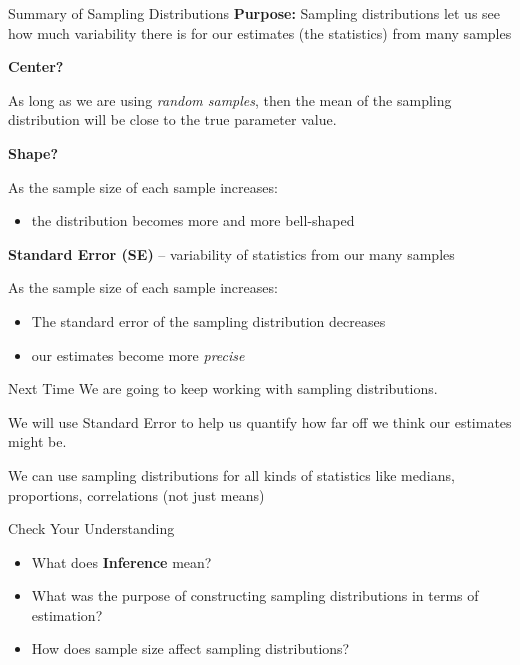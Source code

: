 \documentclass{beamer}
\begin{document}
\begin{frame}{Summary of Sampling Distributions}
\textbf{Purpose:} Sampling distributions let us see how much variability there is for our estimates (the statistics) from many samples \vspace{4mm}

\textbf{Center?}

As long as we are using \textit{random samples}, then the mean of the sampling distribution will be close to the true parameter value. \vspace{4mm}

\textbf{Shape?}

As the sample size of each sample increases:
\begin{itemize}
    \item the distribution becomes more and more bell-shaped
\end{itemize} \vspace{4mm}

\textbf{Standard Error (SE)} -- variability of statistics from our many samples

As the sample size of each sample increases:
\begin{itemize}
    \item The standard error of the sampling distribution decreases
    \item our estimates become more \textit{precise}
\end{itemize}
\end{frame}

\begin{frame}{Next Time}
We are going to keep working with sampling distributions. \vspace{5mm}

We will use Standard Error to help us quantify how far off we think our estimates might be. \vspace{5mm}

We can use sampling distributions for all kinds of statistics like medians, proportions, correlations (not just means)
\end{frame}

\begin{frame}{Check Your Understanding}
\begin{itemize}
    \item What does \textbf{Inference} mean?
    \item What was the purpose of constructing sampling distributions in terms of estimation?
    \item How does sample size affect sampling distributions?
\end{itemize}
\end{frame}


%
%
\end{document}
